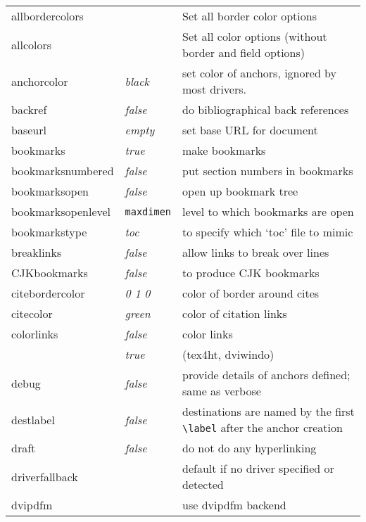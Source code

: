 \documentclass{article}
\newcommand{\bs}{\symbol{'134}}%
\newcommand{\ci}[1]{\texttt{\bs#1}}
\begin{document}
\begin{longtable}{@{}>{\ttfamily}llp{7cm}@{}}
allbordercolors    &                        & Set all border color options\\
allcolors          &                        & Set all color options (without border and field options)\\
anchorcolor        & \textit{black}         & set color of anchors, ignored by most drivers. \\
backref            & \textit{false}         & do bibliographical back references \\
baseurl            & \textit{empty}         & set base URL for document \\
bookmarks          & \textit{true}          & make bookmarks \\
bookmarksnumbered  & \textit{false}         & put section numbers in bookmarks \\
bookmarksopen      & \textit{false}         & open up bookmark tree \\
bookmarksopenlevel & \ttfamily\ci{maxdimen} & level to which bookmarks are open \\
bookmarkstype      & \textit{toc}           & to specify which `toc' file to mimic \\
breaklinks         & \textit{false}         & allow links to break over lines \\
CJKbookmarks       & \textit{false}         & to produce CJK bookmarks\\
citebordercolor    & \textit{0 1 0}         & color of border around cites \\
citecolor          & \textit{green}         & color of citation links \\
colorlinks         & \textit{false}         & color links \\
                   & \textit{true}          & (\textsf{tex4ht}, \textsf{dviwindo}) \\
debug              & \textit{false}         & provide details of anchors defined; same as verbose \\
destlabel          & \textit{false}         & destinations are named by the first \verb|\label| after the anchor creation \\
draft              & \textit{false}         & do not do any hyperlinking \\
driverfallback     &                        & default if no driver specified or detected\\
dvipdfm            &                        & use \textsf{dvipdfm} backend \\

\end{longtable}
\end{document}
